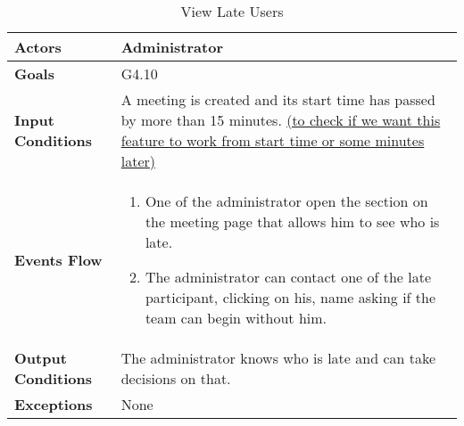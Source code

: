 \begin{table}[H]
	\centering
	\def\arraystretch{1.5}
	\begin{tabular}{|p{7cm}|p{7cm}|}
		\hline
		\textbf{Actors}            & Administrator    \\ \hline
		\textbf{Goals}             & G4.10           \\ \hline
		\textbf{Input Conditions}  & A meeting is created and its start time has passed by more than 15 minutes. \underline{(to check if we want this feature to work from start time or some minutes later)}           \\ \hline
		\textbf{Events Flow}       &  
		\begin{enumerate}[topsep=0pt, leftmargin=*]
			\item One of the administrator open the section on the meeting page that allows him to see who is late.
			\item The administrator can contact one of the late participant, clicking on his, name asking if the team can begin without him.
		\end{enumerate}             \\ \hline
		\textbf{Output Conditions} & The administrator knows who is late and can take decisions on that.           \\ \hline
		\textbf{Exceptions}        & None           \\ \hline
	\end{tabular}
	\caption{View Late Users}
\end{table}

